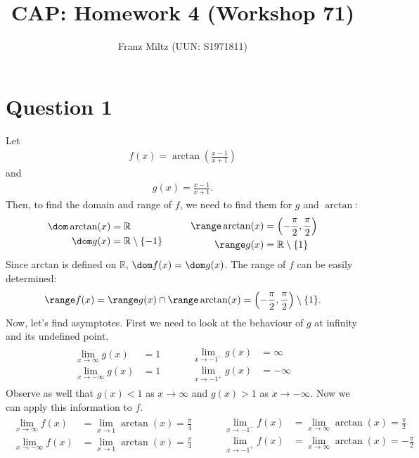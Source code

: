 \documentclass{article}
\title{CAP: Homework 4 (Workshop 71)}
\author{Franz Miltz (UUN: S1971811)}
\begin{document}
\maketitle
\section*{Question 1}
Let
\begin{align*}
	f(x) = \arctan\left(\frac{x-1}{x+1}\right)
\end{align*}
and
\begin{align*}
	g(x) = \frac{x-1}{x+1}.
\end{align*}
Then, to find the domain and range of $f$, we need to find them for $g$ and $\arctan$:
\begin{align*}
	\begin{aligned}
		\dom \arctan(x) & = \mathbb{R}                  \\
		\dom g(x)       & = \mathbb{R} \setminus \{-1\}
	\end{aligned}
	\hspace{1cm}
	\begin{aligned}
		\range \arctan(x) & = \left(-\frac{\pi}{2}, \frac{\pi}{2}\right) \\
		\range g(x)       & = \mathbb{R}\setminus\{1\}
	\end{aligned}
\end{align*}
Since arctan is defined on $\mathbb{R}$, $\dom f(x) = \dom g(x)$. The range of $f$ can be easily determined:
\begin{align*}
	\range f(x) = \range g(x) \cap \range \arctan(x) = \left(-\frac{\pi}{2}, \frac{\pi}{2}\right) \setminus \{1\}.
\end{align*}
Now, let's find asymptotes. First we need to look at the behaviour of $g$ at infinity and its undefined point.
\begin{align*}
	\begin{aligned}
		\lim_{x\to\infty}g(x)  & = 1 \\
		\lim_{x\to-\infty}g(x) & = 1
	\end{aligned}
	\hspace{1cm}
	\begin{aligned}
		\lim_{x\to-1^-}g(x) & =\infty  \\
		\lim_{x\to-1^+}g(x) & =-\infty
	\end{aligned}
\end{align*}
Observe as well that $g(x)<1$ as $x\to\infty$ and $g(x)>1$ as $x\to-\infty$. Now we can apply this information to $f$.
\begin{align*}
	\begin{aligned}
		\lim_{x\to\infty}f(x)  & = \lim_{x\to 1}\arctan(x)=\frac{\pi}{4} \\
		\lim_{x\to-\infty}f(x) & = \lim_{x\to 1}\arctan(x)=\frac{\pi}{4}
	\end{aligned}
	\hspace{1cm}
	\begin{aligned}
		\lim_{x\to-1^-}f(x) & = \lim_{x\to\infty}\arctan(x)= \frac{\pi}{2} \\
		\lim_{x\to-1^+}f(x) & = \lim_{x\to\infty}\arctan(x)=-\frac{\pi}{2}
	\end{aligned}
\end{align*}
\end{document}
